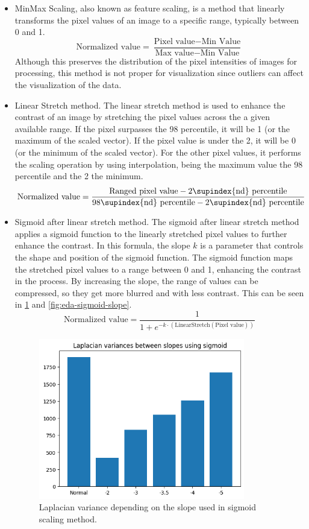 \documentclass[11pt, a4paper]{article}
\begin{document}
	\begin{itemize}
		\item MinMax Scaling, also known as feature scaling, is a method that linearly transforms the pixel values of an image to a specific range, typically between 0 and 1. 
		\[\text{Normalized value} = \frac{\text{Pixel value} - \text{Min Value}}{\text{Max value} - \text{Min Value}}\]
		Although this preserves the distribution of the pixel intensities of images for processing, this method is not proper for visualization since outliers can affect the visualization of the data.
		\item Linear Stretch method. The linear stretch method is used to enhance the contrast of an image by stretching the pixel values across the a given available range.  If the pixel surpasses the 98 percentile, it will be 1 (or the maximum of the scaled vector). If the pixel value is under the 2, it will be 0 (or the minimum of the scaled vector). For the other pixel values, it performs the scaling operation by using interpolation, being the maximum value the 98 percentile and the 2 the minimum.
		\[\text{Normalized value} = \frac{\text{Ranged pixel value} - \text{2\supindex{nd} percentile}}{\text{98\supindex{nd} percentile} - \text{2\supindex{nd} percentile}}\]
		\item Sigmoid after linear stretch method. The sigmoid after linear stretch method applies a sigmoid function to the linearly stretched pixel values to further enhance the contrast. In this formula, the slope $k$ is a parameter that controls the shape and position of the sigmoid function. The sigmoid function maps the stretched pixel values to a range between 0 and 1, enhancing the contrast in the process. By increasing the slope, the range of values can be compressed, so they get more blurred and with less contrast. This can be seen in  \ref{fig:eda-laplacian-vars-slope} and \ref{fig:eda-sigmoid-slope}.
		\[\text{Normalized value} = \frac{1}{1 + e^{-k \cdot(\text{LinearStretch}(\text{Pixel value}))}}\]
			\begin{figure}[H]
			\centering
			\includegraphics[width=9cm]{imgs/eda/sigmoid-slope-2}
			\caption{Laplacian variance depending on the slope used in sigmoid scaling method.}
			\label{fig:eda-laplacian-vars-slope}
		\end{figure}
	\end{itemize}
\end{document}
